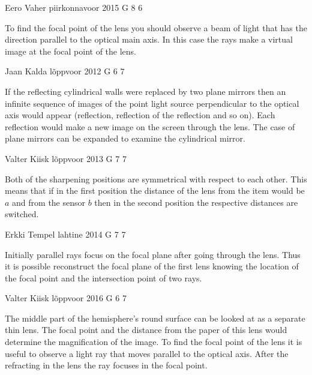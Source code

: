 \documentclass[11pt]{article}
\begin{document}
{Eero Vaher} %
{piirkonnavoor} %
{2015} %
{G 8} %
{6} %
{

\ifEngHint
To find the focal point of the lens you should observe a beam of light that has the direction parallel to the optical main axis. In this case the rays make a virtual image at the focal point of the lens.
\fi
}

{Jaan Kalda} %
{lõppvoor} %
{2012} %
{G 6} %
{7} %
{

\ifEngHint
If the reflecting cylindrical walls were replaced by two plane mirrors then an infinite sequence of images of the point light source perpendicular to the optical axis would appear (reflection, reflection of the reflection and so on). Each reflection would make a new image on the screen through the lens. The case of plane mirrors can be expanded to examine the cylindrical mirror.
\fi
}

{Valter Kiisk} %
{lõppvoor} %
{2013} %
{G 7} %
{7} %
{

\ifEngHint
Both of the sharpening positions are symmetrical with respect to each other. This means that if in the first position the distance of the lens from the item would be $a$ and from the sensor $b$ then in the second position the respective distances are switched.
\fi
}

{Erkki Tempel} %
{lahtine} %
{2014} %
{G 7} %
{7} %
{

\ifEngHint
Initially parallel rays focus on the focal plane after going through the lens. Thus it is possible reconstruct the focal plane of the first lens knowing the location of the focal point and the intersection point of two rays.
\fi
}

{Valter Kiisk} %
{lõppvoor} %
{2016} %
{G 6} %
{7} %
{

\ifEngHint
The middle part of the hemisphere’s round surface can be looked at as a separate thin lens. The focal point and the distance from the paper of this lens would determine the magnification of the image. To find the focal point of the lens it is useful to observe a light ray that moves parallel to the optical axis. After the refracting in the lens the ray focuses in the focal point.
\fi
}
\end{document}

